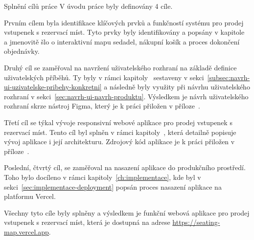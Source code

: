 \begin{section}{Splnění cílů práce}
    \label{sec:zaver-cile}
    V úvodu práce byly definovány 4 cíle.

    Prvním cílem byla identifikace klíčových prvků a funkčností systému pro prodej vstupenek s rezervací míst.
    Tyto prvky byly identifikovány a popsány v kapitole~ a jmenovitě šlo o interaktivní mapu sedadel, nákupní košík a proces dokončení objednávky.

    Druhý cíl se zaměřoval na navržení uživatelského rozhraní na základě definice uživatelských příběhů.
    Ty byly v rámci kapitoly~ sestaveny v sekci~\ref{subsec:navrh-ui-uzivatelske-pribehy-konkretni} a následně byly využity při návrhu uživatelského rozhraní v sekci~\ref{sec:navrh-ui-navrh-produktu}.
    Výsledkem je návrh uživatelského rozhraní skrze nástroj Figma, který je k práci přiložen v příloze~.

    Třetí cíl se týkal vývoje responsivní webové aplikace pro prodej vstupenek s rezervací míst.
    Tento cíl byl splněn v rámci kapitoly~, která detailně popisuje vývoj aplikace i její architekturu.
    Zdrojový kód aplikace je k práci přiložen v příloze~.

    Poslední, čtvrtý cíl, se zaměřoval na nasazení aplikace do produkčního prostředí.
    Toho bylo docíleno v rámci kapitoly~\ref{ch:implementace}, kde byl v sekci~\ref{sec:implementace-deployment} popsán proces nasazení aplikace na platformu Vercel.

    Všechny tyto cíle byly splněny a výsledkem je funkční webová aplikace pro prodej vstupenek s rezervací míst, která je dostupná na adrese \url{https://seating-map.vercel.app}.
\end{section}

